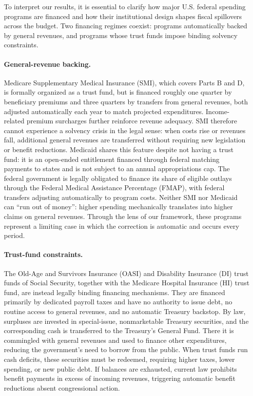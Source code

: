 \documentclass[12pt]{article}%
\theoremstyle{remark}
\begin{document}
To interpret our results, it is essential to clarify how major U.S. federal spending programs are financed and how their institutional design shapes fiscal spillovers across the budget. Two financing regimes coexist: programs automatically backed by general revenues, and programs whose trust funds impose binding solvency constraints.
\paragraph{General-revenue backing.} Medicare Supplementary Medical Insurance (SMI), which covers Parts B and D, is formally organized as a trust fund, but is financed roughly one quarter by beneficiary premiums and three quarters by transfers from general revenues, both adjusted automatically each year to match projected expenditures. Income-related premium surcharges further reinforce revenue adequacy. SMI therefore cannot experience a solvency crisis in the legal sense: when costs rise or revenues fall, additional general revenues are transferred without requiring new legislation or benefit reductions. Medicaid shares this feature despite not having a trust fund: it is an open-ended entitlement financed through federal matching payments to states and is not subject to an annual appropriations cap. The federal government is legally obligated to finance its share of eligible outlays through the Federal Medical Assistance Percentage (FMAP), with federal transfers adjusting automatically to program costs. Neither SMI nor Medicaid can “run out of money”: higher spending mechanically translates into higher claims on general revenues. Through the lens of our framework, these programs represent a limiting case in which the correction is automatic and occurs every period.
\paragraph{Trust-fund constraints.} The Old-Age and Survivors Insurance (OASI) and Disability Insurance (DI) trust funds of Social Security, together with the Medicare Hospital Insurance (HI) trust fund, are instead legally binding financing mechanisms. They are financed primarily by dedicated payroll taxes and have no authority to issue debt, no routine access to general revenues, and no automatic Treasury backstop. By law, surpluses are invested in special-issue, nonmarketable Treasury securities, and the corresponding cash is transferred to the Treasury’s General Fund. There it is commingled with general revenues and used to finance other expenditures, reducing the government’s need to borrow from the public. When trust funds run cash deficits, these securities must be redeemed, requiring higher taxes, lower spending, or new public debt. If balances are exhausted, current law prohibits benefit payments in excess of incoming revenues, triggering automatic benefit reductions absent congressional action.
\end{document}
